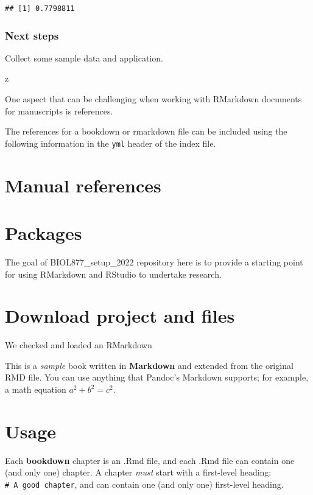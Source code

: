 \documentclass[
]{book}
\begin{document}
\begin{verbatim}
## [1] 0.7798811
\end{verbatim}

\hypertarget{next-steps}{%
\subsubsection{Next steps}\label{next-steps}}

Collect some sample data and application.

z

One aspect that can be challenging when working with RMarkdown documents for manuscripts is references.

The references for a bookdown or rmarkdown file can be included using the following information in the \texttt{yml} header of the index file.

\hypertarget{manual-references}{%
\section{Manual references}\label{manual-references}}

\hypertarget{packages}{%
\section{Packages}\label{packages}}

The goal of BIOL877\_setup\_2022 repository here is to provide a starting point for using RMarkdown and RStudio to undertake research.

\hypertarget{download-project-and-files}{%
\section{Download project and files}\label{download-project-and-files}}

We checked and loaded an RMarkdown

This is a \emph{sample} book written in \textbf{Markdown} and extended from the original RMD file. You can use anything that Pandoc's Markdown supports; for example, a math equation \(a^2 + b^2 = c^2\).

\hypertarget{usage}{%
\section{Usage}\label{usage}}

Each \textbf{bookdown} chapter is an .Rmd file, and each .Rmd file can contain one (and only one) chapter. A chapter \emph{must} start with a first-level heading: \texttt{\#\ A\ good\ chapter}, and can contain one (and only one) first-level heading.
\end{document}
